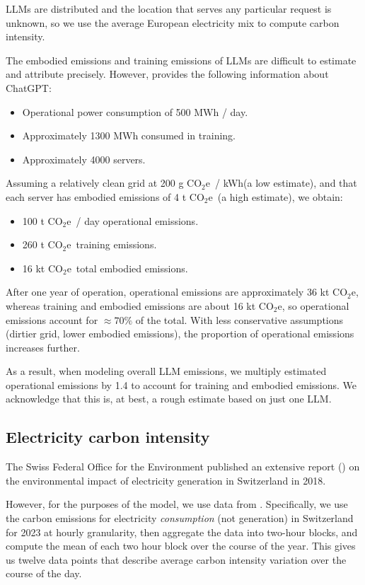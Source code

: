 \documentclass[11pt]{article}
\newcommand{\coe}{CO$_2$e}
\newcommand{\gcoe}{g \coe}
\newcommand{\gcoekwh}{\gcoe\ / kWh}
\begin{document}
LLMs are distributed and the location that serves any particular request is unknown, so we use the
average European electricity mix to compute carbon intensity.

The embodied emissions and training emissions of LLMs are difficult to estimate and attribute precisely.
However, \textcite{devries2023growing} provides the following information about ChatGPT:
\begin{itemize}
    \item Operational power consumption of 500 MWh / day.
    \item Approximately 1300 MWh consumed in training.
    \item Approximately 4000 servers.
\end{itemize}

Assuming a relatively clean grid at 200 \gcoekwh (a low estimate), and that each server has embodied emissions of 4 t \coe\ (a high estimate),
we obtain:
\begin{itemize}
    \item 100 t \coe\ / day operational emissions.
    \item 260 t \coe\ training emissions.
    \item 16 kt \coe\ total embodied emissions.
\end{itemize}

After one year of operation, operational emissions are approximately 36 kt \coe, whereas training and embodied emissions are about 16 kt \coe,
so operational emissions account for $\approx 70\%$ of the total. With less conservative assumptions (dirtier grid, lower embodied emissions),
the proportion of operational emissions increases further.

As a result, when modeling overall LLM emissions, we multiply estimated operational emissions by 1.4 to account for training and embodied emissions.
We acknowledge that this is, at best, a rough estimate based on just one LLM.

\subsection{Electricity carbon intensity}

The Swiss Federal Office for the Environment published an extensive report (\cite{krebs2018umweltbilanz})
on the environmental impact of electricity generation in Switzerland in 2018.

However, for the purposes of the model, we use data from \textcite{electricitymaps}. Specifically,
we use the carbon emissions for electricity {\em consumption} (not generation) in Switzerland for 2023
at hourly granularity, then aggregate the data into two-hour blocks, and compute the mean of each two
hour block over the course of the year. This gives us twelve data points that describe average
carbon intensity variation over the course of the day.
\end{document}
